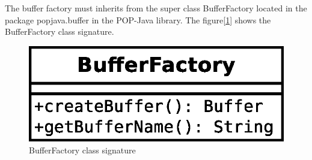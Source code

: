 \pagebreak
The buffer factory must inherits from the super class BufferFactory located in the package popjava.buffer in the POP-Java library. The figure[\ref{fig:bufferfactory_class}] shows the BufferFactory class signature.
\begin{figure}[ht]
\caption{BufferFactory class signature}
\center
\label{fig:bufferfactory_class}
\includegraphics[scale=0.5]{bufferfactory.eps}
\end{figure}


